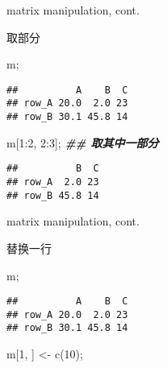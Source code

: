 \documentclass[ignorenonframetext,]{beamer}
\newenvironment{Shaded}{\begin{snugshade}}{\end{snugshade}}
\newcommand{\DecValTok}[1]{\textcolor[rgb]{0.00,0.00,0.81}{#1}}
\newcommand{\DocumentationTok}[1]{\textcolor[rgb]{0.56,0.35,0.01}{\textbf{\textit{#1}}}}
\newcommand{\FunctionTok}[1]{\textcolor[rgb]{0.00,0.00,0.00}{#1}}
\newcommand{\NormalTok}[1]{#1}
\newcommand{\OtherTok}[1]{\textcolor[rgb]{0.56,0.35,0.01}{#1}}
\newcommand{\SpecialCharTok}[1]{\textcolor[rgb]{0.00,0.00,0.00}{#1}}
\newcommand\FontSmall{\fontsize{7}{8}\selectfont}
\begin{document}
\begin{frame}[fragile]{matrix manipulation, cont.}
\protect\hypertarget{matrix-manipulation-cont.-2}{}
\begin{block}{取部分}
\protect\hypertarget{ux53d6ux90e8ux5206-1}{}
\FontSmall

\begin{Shaded}
\begin{Highlighting}[]
\NormalTok{m;}
\end{Highlighting}
\end{Shaded}

\begin{verbatim}
##          A    B  C
## row_A 20.0  2.0 23
## row_B 30.1 45.8 14
\end{verbatim}

\begin{Shaded}
\begin{Highlighting}[]
\NormalTok{m[}\DecValTok{1}\SpecialCharTok{:}\DecValTok{2}\NormalTok{, }\DecValTok{2}\SpecialCharTok{:}\DecValTok{3}\NormalTok{]; }\DocumentationTok{\#\# 取其中一部分}
\end{Highlighting}
\end{Shaded}

\begin{verbatim}
##          B  C
## row_A  2.0 23
## row_B 45.8 14
\end{verbatim}
\end{block}
\end{frame}

\begin{frame}[fragile]{matrix manipulation, cont.}
\protect\hypertarget{matrix-manipulation-cont.-3}{}
\begin{block}{替换一行}
\protect\hypertarget{ux66ffux6362ux4e00ux884c}{}
\FontSmall

\begin{Shaded}
\begin{Highlighting}[]
\NormalTok{m;}
\end{Highlighting}
\end{Shaded}

\begin{verbatim}
##          A    B  C
## row_A 20.0  2.0 23
## row_B 30.1 45.8 14
\end{verbatim}

\begin{Shaded}
\begin{Highlighting}[]
\NormalTok{m[}\DecValTok{1}\NormalTok{, ] }\OtherTok{\textless{}{-}} \FunctionTok{c}\NormalTok{(}\DecValTok{10}\NormalTok{);}
\end{Highlighting}
\end{Shaded}
\end{block}
\end{frame}
\end{document}
